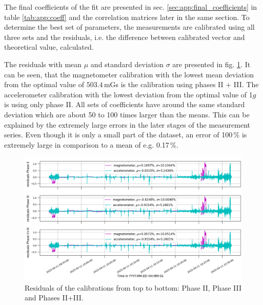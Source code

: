 The final coefficients of the fit are presented in sec. \ref{sec:app:final_coefficients} in table \ref{tab:app:coeff} and the correlation matrices later in the same section. To determine the best set of parameters, the measurements are calibrated using all three sets and the residuals, i.e. the difference between calibrated vector and theoretical value, calculated. 

The residuals with mean $\mu$ and standard deviation $\sigma$ are presented in fig. \ref{fig:res:residuals}. It can be seen, that the magnetometer calibration with the lowest mean deviation from the optimal value of $503.4$\,mGs is the calibration using phases II + III. The accelerometer calibration with the lowest deviation from the optimal value of 1$g$ is using only phase II. All sets of coefficients have around the same standard deviation which are about 50 to 100 times larger than the means. This can be explained by the extremely large errors in the later stages of the measurement series. Even though it is only a small part of the dataset, an error of 100\,\% is extremely large in comparison to a mean of e.g. 0.17\,\%.
\begin{figure}[H]
    \centering
    \includegraphics[width=\linewidth]{images/04_results/residuals_mag_acc_calibrations.png}
    \caption[Residuals of the calibrations.]{Residuals of the calibrations from top to bottom: Phase II, Phase III and Phases II+III.}
    \label{fig:res:residuals}
\end{figure}


